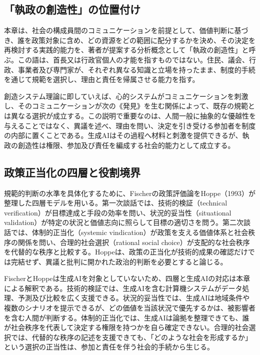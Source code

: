 \subsection{「執政の創造性」の位置付け}

本章は、社会の構成員間のコミュニケーションを前提として、価値判断に基づき、誰を政策対象に含め、どの資源をどの範囲に配分するかを決め、その決定を再検討する実践的能力を、著者が提案する分析概念として「執政の創造性」と呼ぶ。この語は、首長又は行政官個人の才能を指すものではない。住民、議会、行政、事業者及び専門家が、それぞれ異なる知識と立場を持ったまま、制度的手続を通じて規範を選択し、理由と責任を帰属させる能力を指す。

創造システム理論に即していえば、心的システムがコミュニケーションを刺激し、そのコミュニケーションが次の《発見》を生む関係によって、既存の規範とは異なる選択が成立する\cite{iba2010autopoietic,kneer1993luhmanns}。この説明で重要なのは、人間一般に抽象的な優越性を与えることではなく、異議を述べ、理由を問い、決定を引き受ける参加者を制度の内部に置くことである。生成AIはその過程へ材料と刺激を提供できるが、執政の創造性は権限、参加及び責任を編成する社会的能力として成立する。

\subsection{政策正当化の四層と役割境界}

規範的判断の水準を具体化するために、Fischerの政策評価論をHoppe（1993）が整理した四層モデルを用いる\cite{hoppe1993political}。第一次談話では、技術的検証（technical verification）が目標達成と手段の効率を問い、状況的妥当性（situational validation）が特定の状況と価値志向に照らして目標の適切さを問う。第二次談話では、体制的正当化（systemic vindication）が政策を支える価値体系と社会秩序の関係を問い、合理的社会選択（rational social choice）が支配的な社会秩序を代替的な秩序と比較する。Hoppeは、政策の正当化が技術的成果の確認だけでは完結せず、異議と批判に開かれた政治的判断を必要とすると論じる\cite{hoppe1993political}。

FischerとHoppeは生成AIを対象としていないため、四層と生成AIの対応は本章による解釈である。技術的検証では、生成AIを含む計算機システムがデータ処理、予測及び比較を広く支援できる。状況的妥当性では、生成AIは地域条件や複数のシナリオを提示できるが、どの価値を当該状況で優先するかは、被影響者を含む人間が判断する。体制的正当化では、生成AIは論拠を整理できても、誰が社会秩序を代表して決定する権限を持つかを自ら確定できない。合理的社会選択では、代替的な秩序の記述を支援できても、「どのような社会を形成するか」という選択の正当性は、参加と責任を伴う社会的手続から生じる\cite{dryzek1993policy}。

